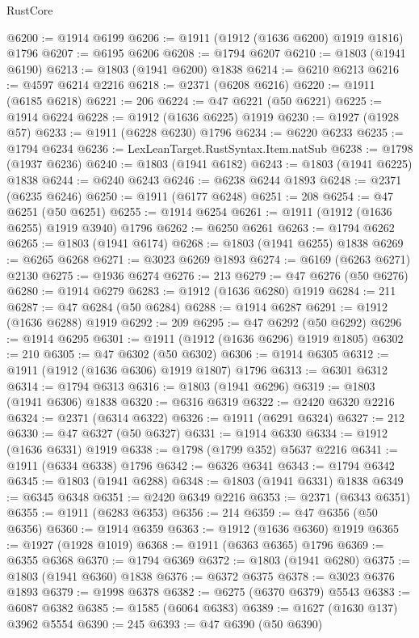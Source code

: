 \begin{lexlean}{RustCore}
\begin{coremodule}
@6200 := @1914 @6199
@6206 := @1911 (@1912 (@1636 @6200) @1919 @1816) @1796
@6207 := @6195 @6206
@6208 := @1794 @6207
@6210 := @1803 (@1941 @6190)
@6213 := @1803 (@1941 @6200) @1838
@6214 := @6210 @6213
@6216 := @4597 @6214 @2216
@6218 := @2371 (@6208 @6216)
@6220 := @1911 (@6185 @6218)
@6221 := 206
@6224 := @47 @6221 (@50 @6221)
@6225 := @1914 @6224
@6228 := @1912 (@1636 @6225) @1919
@6230 := @1927 (@1928 @57)
@6233 := @1911 (@6228 @6230) @1796
@6234 := @6220 @6233
@6235 := @1794 @6234
@6236 := LexLeanTarget.RustSyntax.Item.natSub
@6238 := @1798 (@1937 @6236)
@6240 := @1803 (@1941 @6182)
@6243 := @1803 (@1941 @6225) @1838
@6244 := @6240 @6243
@6246 := @6238 @6244 @1893
@6248 := @2371 (@6235 @6246)
@6250 := @1911 (@6177 @6248)
@6251 := 208
@6254 := @47 @6251 (@50 @6251)
@6255 := @1914 @6254
@6261 := @1911 (@1912 (@1636 @6255) @1919 @3940) @1796
@6262 := @6250 @6261
@6263 := @1794 @6262
@6265 := @1803 (@1941 @6174)
@6268 := @1803 (@1941 @6255) @1838
@6269 := @6265 @6268
@6271 := @3023 @6269 @1893
@6274 := @6169 (@6263 @6271) @2130
@6275 := @1936 @6274
@6276 := 213
@6279 := @47 @6276 (@50 @6276)
@6280 := @1914 @6279
@6283 := @1912 (@1636 @6280) @1919
@6284 := 211
@6287 := @47 @6284 (@50 @6284)
@6288 := @1914 @6287
@6291 := @1912 (@1636 @6288) @1919
@6292 := 209
@6295 := @47 @6292 (@50 @6292)
@6296 := @1914 @6295
@6301 := @1911 (@1912 (@1636 @6296) @1919 @1805)
@6302 := 210
@6305 := @47 @6302 (@50 @6302)
@6306 := @1914 @6305
@6312 := @1911 (@1912 (@1636 @6306) @1919 @1807) @1796
@6313 := @6301 @6312
@6314 := @1794 @6313
@6316 := @1803 (@1941 @6296)
@6319 := @1803 (@1941 @6306) @1838
@6320 := @6316 @6319
@6322 := @2420 @6320 @2216
@6324 := @2371 (@6314 @6322)
@6326 := @1911 (@6291 @6324)
@6327 := 212
@6330 := @47 @6327 (@50 @6327)
@6331 := @1914 @6330
@6334 := @1912 (@1636 @6331) @1919
@6338 := @1798 (@1799 @352) @5637 @2216
@6341 := @1911 (@6334 @6338) @1796
@6342 := @6326 @6341
@6343 := @1794 @6342
@6345 := @1803 (@1941 @6288)
@6348 := @1803 (@1941 @6331) @1838
@6349 := @6345 @6348
@6351 := @2420 @6349 @2216
@6353 := @2371 (@6343 @6351)
@6355 := @1911 (@6283 @6353)
@6356 := 214
@6359 := @47 @6356 (@50 @6356)
@6360 := @1914 @6359
@6363 := @1912 (@1636 @6360) @1919
@6365 := @1927 (@1928 @1019)
@6368 := @1911 (@6363 @6365) @1796
@6369 := @6355 @6368
@6370 := @1794 @6369
@6372 := @1803 (@1941 @6280)
@6375 := @1803 (@1941 @6360) @1838
@6376 := @6372 @6375
@6378 := @3023 @6376 @1893
@6379 := @1998 @6378
@6382 := @6275 (@6370 @6379) @5543
@6383 := @6087 @6382
@6385 := @1585 (@6064 @6383)
@6389 := @1627 (@1630 @137) @3962 @5554
@6390 := 245
@6393 := @47 @6390 (@50 @6390)

\end{coremodule}
\end{lexlean}

